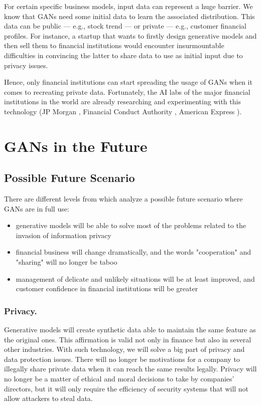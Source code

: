 \documentclass[runningheads]{llncs}
\begin{document}
For certain specific business models, input data can represent a huge barrier. We know that GANs need some initial data to learn the associated distribution. This data can be public — e.g., stock trend — or private — e.g., customer financial profiles.
For instance, a startup that wants to firstly design generative models and then sell them to financial institutions would encounter insurmountable difficulties in convincing the latter to share data to use as initial input due to privacy issues. 

Hence, only financial institutions can start spreading the usage of GANs when it comes to recreating private data. Fortunately, the AI labs of the major financial institutions in the world are already researching and experimenting with this technology (JP Morgan \cite{JP}, Financial Conduct Authority \cite{sandbox,FCA}, American Express \cite{AMEX}).

\section{GANs in the Future}\label{future}
\subsection{Possible Future Scenario}
There are different levels from which analyze a possible future scenario where GANs are in full use:

\begin{itemize}
  \item generative models will be able to solve most of the problems related to the invasion of information privacy
  \item financial business will change dramatically, and the words "cooperation" and "sharing" will no longer be taboo
  \item management of delicate and unlikely situations will be at least improved, and customer confidence in financial institutions will be greater
\end{itemize}

\subsubsection{Privacy.}
Generative models will create synthetic data able to maintain the same feature as the original ones. This affirmation is valid not only in finance but also in several other industries. With such technology, we will solve a big part of privacy and data protection issues. There will no longer be motivations for a company to illegally share private data when it can reach the same results legally. Privacy will no longer be a matter of ethical and moral decisions to take by companies’ directors, but it will only require the efficiency of security systems that will not allow attackers to steal data.
\end{document}
